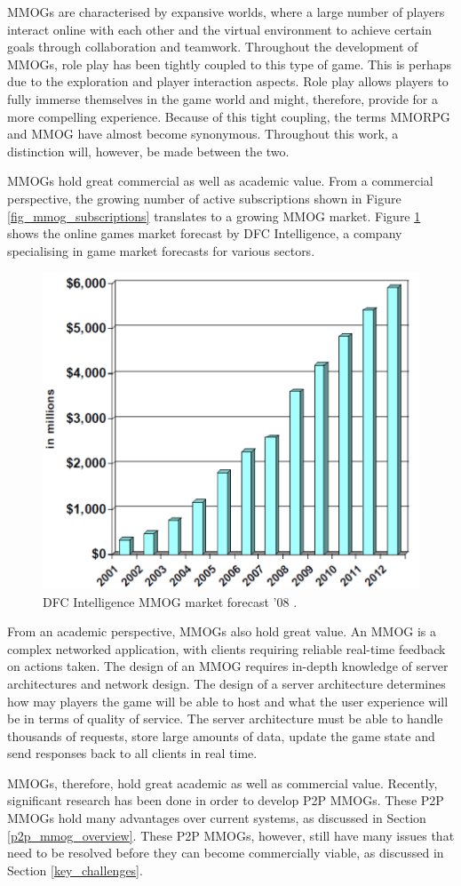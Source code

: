 \documentclass[journal,oneside,a4paper,onecolumn]{IEEEtran}
\begin{document}
\acp{MMOG} are characterised by expansive worlds, where a large number of players interact online with each other and the virtual environment to achieve certain goals through collaboration and teamwork. Throughout the development of \acp{MMOG}, role play has been tightly coupled to this type of game. This is perhaps due to the exploration and player interaction aspects. Role play allows players to fully immerse themselves in the game world and might, therefore, provide for a more compelling experience. Because of this tight coupling, the terms \ac{MMORPG} and \ac{MMOG} have almost become synonymous. Throughout this work, a distinction will, however, be made between the two.

\acp{MMOG} hold great commercial as well as academic value. From a commercial perspective, the growing number of active subscriptions shown in Figure \ref{fig_mmog_subscriptions} translates to a growing \ac{MMOG} market. Figure \ref{fig_mmog_market} shows the online games market forecast by DFC Intelligence, a company specialising in game market forecasts for various sectors.
%
\begin{figure}[htbp]
 \centering
 \includegraphics[width=0.4\columnwidth]{DFC_MMOG_market}
 \caption{DFC Intelligence MMOG market forecast '08 \cite{Fan_phd}.}
 \label{fig_mmog_market}
\end{figure}

From an academic perspective, \acp{MMOG} also hold great value. An MMOG is a complex networked application, with clients requiring reliable real-time feedback on actions taken. The design of an MMOG requires in-depth knowledge of server architectures and network design. The design of a server architecture determines how may players the game will be able to host and what the user experience will be in terms of quality of service. The server architecture must be able to handle thousands of requests, store large amounts of data, update the game state and send responses back to all clients in real time.

MMOGs, therefore, hold great academic as well as commercial value. Recently, significant research has been done in order to develop \ac{P2P} MMOGs. These P2P MMOGs hold many advantages over current systems, as discussed in Section \ref{p2p_mmog_overview}. These \ac{P2P} MMOGs, however, still have many issues that need to be resolved before they can become commercially viable, as discussed in Section \ref{key_challenges}.
\end{document}
